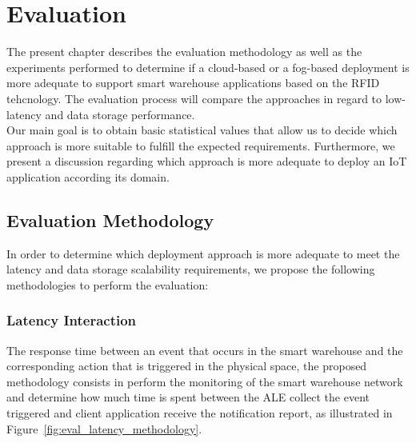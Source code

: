 
\chapter{Evaluation}
\label{chapter:evaluation}
The present chapter describes the evaluation methodology as well as the experiments performed to determine
if a cloud-based or a fog-based deployment is more adequate to support smart warehouse applications
based on the \gls{RFID} tehcnology. The evaluation process will compare the approaches in regard to low-latency and data
storage performance.\\

Our main goal is to obtain basic statistical values that allow us to decide which approach is more
suitable to fulfill the expected requirements. Furthermore, we present a discussion regarding which
approach is more adequate to deploy an \gls{IoT} application according its domain.

\section{Evaluation Methodology}
\label{sec:eval_methodology}
In order to determine which deployment approach is more adequate to meet the latency and data storage scalability
requirements, we propose the following methodologies to perform the evaluation:

\subsection{Latency Interaction}
\label{sub:eval_methodology_latency}
The response time between an event that occurs in the smart warehouse and the corresponding action
that is triggered in the physical space, the proposed methodology consists in perform the monitoring
of the smart warehouse network and determine how much time is spent between the \gls{ALE} collect the
event triggered and client application receive the notification report, as illustrated in
Figure~\ref{fig:eval_latency_methodology}.

